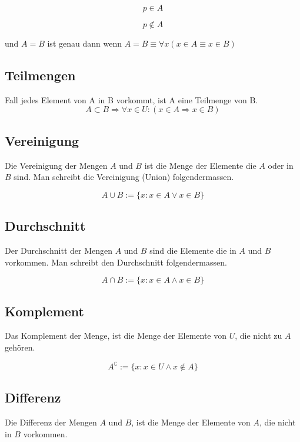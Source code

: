 \documentclass[12pt, a4paper, oneside]{article}
\begin{document}
\begin{equation}
  p \in A
\end{equation}

\begin{equation}
  p \notin A
\end{equation}

und $A = B$ ist genau dann wenn $A = B \equiv \forall x (x \in A \equiv x \in B)$

\subsection{Teilmengen}
Fall jedes Element von A in B vorkommt, ist A eine Teilmenge von B.
\begin{equation}
  A \subset B \Rightarrow \forall x \in U : (x \in A \Rightarrow x \in B)
\end{equation}

\subsection{Vereinigung}
Die Vereinigung der Mengen $A$ und $B$ ist die Menge der Elemente die $A$ oder in $B$ sind. Man schreibt die Vereinigung (Union) folgendermassen.

\begin{equation}
  A \cup B := \{x : x \in A \lor x \in B\}
\end{equation}

\subsection{Durchschnitt}
Der Durchschnitt der Mengen $A$ und $B$ sind die Elemente die in $A$ und $B$ vorkommen. Man schreibt den Durchschnitt folgendermassen.

\begin{equation}
  A \cap B := \{x : x \in A \land x \in B\}
\end{equation}

\subsection{Komplement}
Das Komplement der Menge, ist die Menge der Elemente von $U$, die nicht zu $A$ gehören.

\begin{equation}
  A^\complement := \{x : x \in U \land x \notin A\}
\end{equation}

\subsection{Differenz}
Die Differenz der Mengen $A$ und $B$, ist die Menge der Elemente von $A$, die nicht in $B$ vorkommen.
\end{document}
